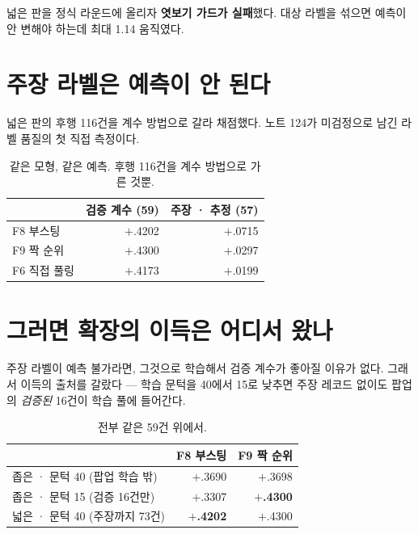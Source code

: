 \documentclass[10pt]{article}
\begin{document}
넓은 판을 정식 라운드에 올리자 \textbf{엿보기 가드가 실패}했다. 대상 라벨을
섞으면 예측이 안 변해야 하는데 최대 1.14 움직였다.


\section{주장 라벨은 예측이 안 된다}

넓은 판의 후행 116건을 계수 방법으로 갈라 채점했다. 노트 124가 미검정으로
남긴 라벨 품질의 첫 직접 측정이다.

\begin{table}[t]
\centering\tsize
\caption{같은 모형, 같은 예측. 후행 116건을 계수 방법으로 가른 것뿐.}
\begin{tabular}{lrr}
\toprule
& 검증 계수 (59) & 주장 · 추정 (57) \\
\midrule
F8 부스팅 & $+$.4202 & $+$.0715 \\
F9 짝 순위 & $+$.4300 & $+$.0297 \\
F6 직접 풀링 & $+$.4173 & $+$.0199 \\
\bottomrule
\end{tabular}
\end{table}


\section{그러면 확장의 이득은 어디서 왔나}

주장 라벨이 예측 불가라면, 그것으로 학습해서 검증 계수가 좋아질 이유가
없다. 그래서 이득의 출처를 갈랐다 --- 학습 문턱을 40에서 15로 낮추면
주장 레코드 없이도 팝업의 \emph{검증된} 16건이 학습 풀에 들어간다.

\begin{table}[t]
\centering\tsize
\caption{전부 같은 59건 위에서.}
\begin{tabular}{lrr}
\toprule
& F8 부스팅 & F9 짝 순위 \\
\midrule
좁은 · 문턱 40 (팝업 학습 밖) & $+$.3690 & $+$.3698 \\
좁은 · 문턱 15 (검증 16건만) & $+$.3307 & \textbf{$+$.4300} \\
넓은 · 문턱 40 (주장까지 73건) & \textbf{$+$.4202} & $+$.4300 \\
\bottomrule
\end{tabular}
\end{table}
\end{document}
